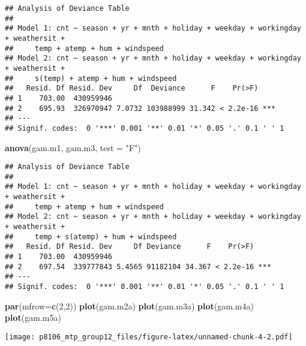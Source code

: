 \documentclass[]{article}
\newenvironment{Shaded}{\begin{snugshade}}{\end{snugshade}}
\newcommand{\KeywordTok}[1]{\textcolor[rgb]{0.13,0.29,0.53}{\textbf{#1}}}
\newcommand{\DataTypeTok}[1]{\textcolor[rgb]{0.13,0.29,0.53}{#1}}
\newcommand{\DecValTok}[1]{\textcolor[rgb]{0.00,0.00,0.81}{#1}}
\newcommand{\StringTok}[1]{\textcolor[rgb]{0.31,0.60,0.02}{#1}}
\newcommand{\NormalTok}[1]{#1}
\begin{document}
\begin{verbatim}
## Analysis of Deviance Table
## 
## Model 1: cnt ~ season + yr + mnth + holiday + weekday + workingday + weathersit + 
##     temp + atemp + hum + windspeed
## Model 2: cnt ~ season + yr + mnth + holiday + weekday + workingday + weathersit + 
##     s(temp) + atemp + hum + windspeed
##   Resid. Df Resid. Dev     Df  Deviance      F    Pr(>F)    
## 1    703.00  430959946                                      
## 2    695.93  326970947 7.0732 103988999 31.342 < 2.2e-16 ***
## ---
## Signif. codes:  0 '***' 0.001 '**' 0.01 '*' 0.05 '.' 0.1 ' ' 1
\end{verbatim}

\begin{Shaded}
\begin{Highlighting}[]
\KeywordTok{anova}\NormalTok{(gam.m1, gam.m3, }\DataTypeTok{test =} \StringTok{"F"}\NormalTok{)}
\end{Highlighting}
\end{Shaded}

\begin{verbatim}
## Analysis of Deviance Table
## 
## Model 1: cnt ~ season + yr + mnth + holiday + weekday + workingday + weathersit + 
##     temp + atemp + hum + windspeed
## Model 2: cnt ~ season + yr + mnth + holiday + weekday + workingday + weathersit + 
##     temp + s(atemp) + hum + windspeed
##   Resid. Df Resid. Dev     Df Deviance      F    Pr(>F)    
## 1    703.00  430959946                                     
## 2    697.54  339777843 5.4565 91182104 34.367 < 2.2e-16 ***
## ---
## Signif. codes:  0 '***' 0.001 '**' 0.01 '*' 0.05 '.' 0.1 ' ' 1
\end{verbatim}

\begin{Shaded}
\begin{Highlighting}[]
\KeywordTok{par}\NormalTok{(}\DataTypeTok{mfrow=}\KeywordTok{c}\NormalTok{(}\DecValTok{2}\NormalTok{,}\DecValTok{2}\NormalTok{))}
\KeywordTok{plot}\NormalTok{(gam.m2a)}
\KeywordTok{plot}\NormalTok{(gam.m3a)}
\KeywordTok{plot}\NormalTok{(gam.m4a)}
\KeywordTok{plot}\NormalTok{(gam.m5a)}
\end{Highlighting}
\end{Shaded}

\texttt{[image: p8106\_mtp\_group12\_files/figure-latex/unnamed-chunk-4-2.pdf]}
\end{document}
